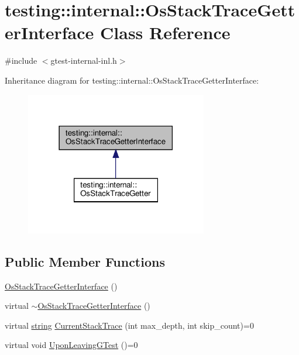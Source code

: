 \hypertarget{classtesting_1_1internal_1_1_os_stack_trace_getter_interface}{}\section{testing\+:\+:internal\+:\+:Os\+Stack\+Trace\+Getter\+Interface Class Reference}
\label{classtesting_1_1internal_1_1_os_stack_trace_getter_interface}


{\ttfamily \#include $<$gtest-\/internal-\/inl.\+h$>$}



Inheritance diagram for testing\+:\+:internal\+:\+:Os\+Stack\+Trace\+Getter\+Interface\+:
\nopagebreak
\begin{figure}[H]
\begin{center}
\leavevmode
\includegraphics[width=225pt]{classtesting_1_1internal_1_1_os_stack_trace_getter_interface__inherit__graph}
\end{center}
\end{figure}
\subsection*{Public Member Functions}
\begin{DoxyCompactItemize}
\item 
\hyperlink{classtesting_1_1internal_1_1_os_stack_trace_getter_interface_afbe9eb0ca8775fbb98ff0720011b6708}{Os\+Stack\+Trace\+Getter\+Interface} ()
\item 
virtual \hyperlink{classtesting_1_1internal_1_1_os_stack_trace_getter_interface_a193f4a1de4af9b78010c659912df5a15}{$\sim$\+Os\+Stack\+Trace\+Getter\+Interface} ()
\item 
virtual \hyperlink{namespacetesting_1_1internal_a8e8ff5b11e64078831112677156cb111}{string} \hyperlink{classtesting_1_1internal_1_1_os_stack_trace_getter_interface_a6965eadb9b340808718fab9f1475c49a}{Current\+Stack\+Trace} (int max\+\_\+depth, int skip\+\_\+count)=0
\item 
virtual void \hyperlink{classtesting_1_1internal_1_1_os_stack_trace_getter_interface_a791bd120428b5a53d5eeba1b27296a39}{Upon\+Leaving\+G\+Test} ()=0
\end{DoxyCompactItemize}
